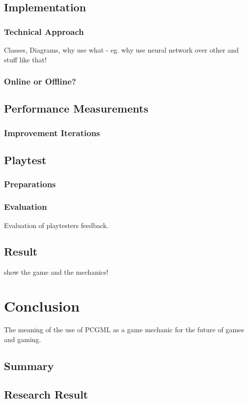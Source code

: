 \documentclass[MGS,Master,english]{twbook}%
\begin{document}
\section{Implementation}
\subsection{Technical Approach}
Classes, Diagrams, why use what - eg. why use neural network over other and stuff like that!
\subsection{Online or Offline?}
\section{Performance Measurements}
\subsection{Improvement Iterations}
\section{Playtest}
\subsection{Preparations}
\subsection{Evaluation}
Evaluation of playtesters feedback.
\section{Result}
show the game and the mechanics!

%
%
\clearpage
\chapter{Conclusion}
The meaning of the use of PCGML as a game mechanic for the future of games and gaming. 
\section{Summary}
\section{Research Result}
\end{document}
